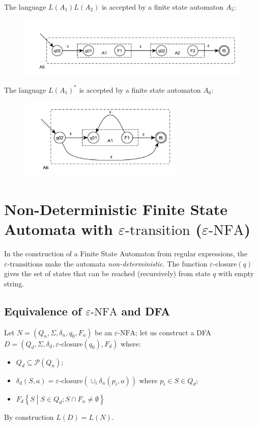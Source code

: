 The language $L(A_1)L(A_2)$ is accepted by a finite state automaton $A_5$:
\begin{figure}[H]
	\centerline{\includegraphics[width=1\textwidth]{img/8.pdf}}
\end{figure}

The language $L(A_1)^\ast$ is accepted by a finite state automaton $A_6$:
\begin{figure}[H]
	\centerline{\includegraphics[width=0.7\textwidth]{img/9.pdf}}
\end{figure}

\section{Non-Deterministic Finite State Automata with $\varepsilon\text{-transition}$ ($\varepsilon\text{-NFA}$)}
In the construction of a Finite State Automaton from regular expressions, the $\varepsilon\text{-transitions}$ make the automata \emph{non-deterministic}.
The function $\varepsilon\text{-closure}(q)$ gives the set of states that can be reached (recursively) from state $q$ with empty string.

\subsection{Equivalence of $\varepsilon\text{-NFA}$ and DFA}
Let $N = (Q_n, \Sigma, \delta_n, q_0, F_n)$ be an $\varepsilon\text{-NFA}$; let us construct a DFA $D = (Q_d, \Sigma, \delta_d, \varepsilon\text{-closure}(q_0), F_d)$ where:
\begin{itemize}
	\item $Q_d \subseteq \mathscr{P}(Q_n)$;
	\item $\delta_d(S, a) = \varepsilon\text{-closure}(\cup_i \delta_n(p_i, a))$ where $p_i \in S \in Q_d$;
	\item $F_d \left\{S \middle| S \in Q_d; S \cap F_n \neq \emptyset\right\}$
\end{itemize}
By construction $L(D) = L(N)$.

